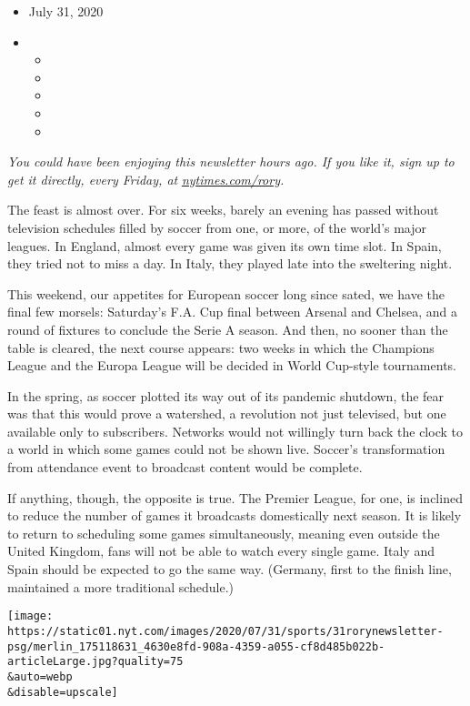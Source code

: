\begin{itemize}
\item
  July 31, 2020
\item
  \begin{itemize}
  \item
  \item
  \item
  \item
  \item
  \end{itemize}
\end{itemize}

\emph{You could have been enjoying this newsletter hours ago. If you
like it, sign up to get it directly, every Friday, at}
\href{https://www.nytimes.com/newsletters/rory-smith?smid=rd}{\emph{nytimes.com/rory}}\emph{.}

The feast is almost over. For six weeks, barely an evening has passed
without television schedules filled by soccer from one, or more, of the
world's major leagues. In England, almost every game was given its own
time slot. In Spain, they tried not to miss a day. In Italy, they played
late into the sweltering night.

This weekend, our appetites for European soccer long since sated, we
have the final few morsels: Saturday's F.A. Cup final between Arsenal
and Chelsea, and a round of fixtures to conclude the Serie A season. And
then, no sooner than the table is cleared, the next course appears: two
weeks in which the Champions League and the Europa League will be
decided in World Cup-style tournaments.

In the spring, as soccer plotted its way out of its pandemic shutdown,
the fear was that this would prove a watershed, a revolution not just
televised, but one available only to subscribers. Networks would not
willingly turn back the clock to a world in which some games could not
be shown live. Soccer's transformation from attendance event to
broadcast content would be complete.

If anything, though, the opposite is true. The Premier League, for one,
is inclined to reduce the number of games it broadcasts domestically
next season. It is likely to return to scheduling some games
simultaneously, meaning even outside the United Kingdom, fans will not
be able to watch every single game. Italy and Spain should be expected
to go the same way. (Germany, first to the finish line, maintained a
more traditional schedule.)

\texttt{[image: https://static01.nyt.com/images/2020/07/31/sports/31rorynewsletter-psg/merlin\_175118631\_4630e8fd-908a-4359-a055-cf8d485b022b-articleLarge.jpg?quality=75\\\&auto=webp\\\&disable=upscale]}

